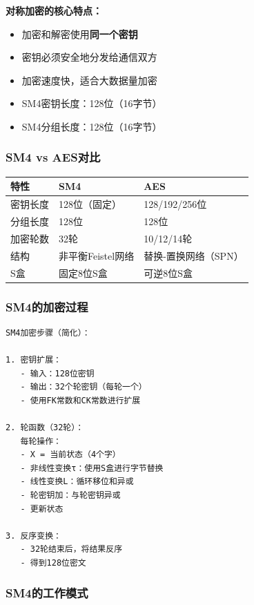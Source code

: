 ﻿\documentclass[12pt,a4paper]{article}
\begin{document}
\begin{theorybox}
\textbf{对称加密的核心特点：}
\begin{itemize}
\item 加密和解密使用\textbf{同一个密钥}
\item 密钥必须安全地分发给通信双方
\item 加密速度快，适合大数据量加密
\item SM4密钥长度：128位（16字节）
\item SM4分组长度：128位（16字节）
\end{itemize}
\end{theorybox}

\subsubsection{SM4 vs AES对比}

\begin{center}
\begin{tabular}{|l|l|l|}
\hline
\textbf{特性} & \textbf{SM4} & \textbf{AES} \\
\hline
密钥长度 & 128位（固定） & 128/192/256位 \\
\hline
分组长度 & 128位 & 128位 \\
\hline
加密轮数 & 32轮 & 10/12/14轮 \\
\hline
结构 & 非平衡Feistel网络 & 替换-置换网络（SPN） \\
\hline
S盒 & 固定8位S盒 & 可逆8位S盒 \\
\hline
\end{tabular}
\end{center}

\subsubsection{SM4的加密过程}

\begin{lstlisting}
SM4加密步骤（简化）：

1. 密钥扩展：
   - 输入：128位密钥
   - 输出：32个轮密钥（每轮一个）
   - 使用FK常数和CK常数进行扩展

2. 轮函数（32轮）：
   每轮操作：
   - X = 当前状态（4个字）
   - 非线性变换τ：使用S盒进行字节替换
   - 线性变换L：循环移位和异或
   - 轮密钥加：与轮密钥异或
   - 更新状态

3. 反序变换：
   - 32轮结束后，将结果反序
   - 得到128位密文
\end{lstlisting}

\subsubsection{SM4的工作模式}
\end{document}
